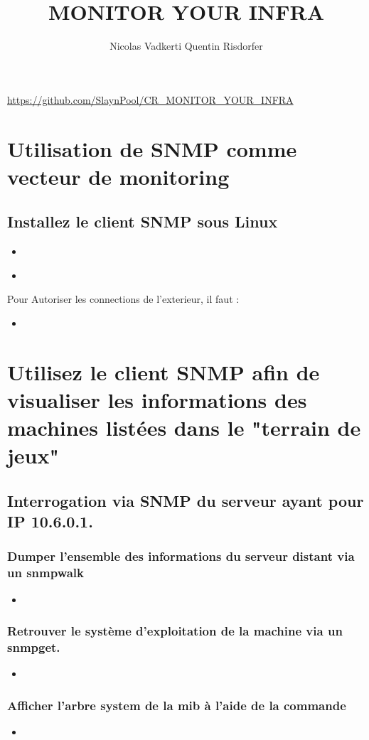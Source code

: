 \documentclass[10pt,a4paper]{article}
\title{MONITOR YOUR INFRA}
\author{Nicolas Vadkerti Quentin Risdorfer}
\newcommand{\insertcode}[2]{\begin{itemize}\item[]\end{itemize}}
\begin{document}
\maketitle


\url{https://github.com/SlaynPool/CR_MONITOR_YOUR_INFRA}



\section{Utilisation de SNMP comme vecteur de monitoring}
\subsection{Installez le client SNMP sous Linux}

\insertcode{commande/1.txt}{Installation d'un Client}

\insertcode{commande/2.txt}{Test d'interrogation}

Pour Autoriser les connections de l'exterieur, il faut :

\insertcode{commande/3.txt}{snmpd.conf}

\section{Utilisez le client SNMP afin de visualiser les informations des machines listées dans le "terrain de jeux"}
\subsection{Interrogation via SNMP du serveur ayant pour IP 10.6.0.1.}

\subsubsection{Dumper l’ensemble des informations du serveur distant via un snmpwalk}
\insertcode{commande/4.txt}{snmpwalk}

\subsubsection{Retrouver le système d’exploitation de la machine via un snmpget.}
\insertcode{commande/5.txt}{snmpget}

\subsubsection{Afficher l’arbre system de la mib à l’aide de la commande }
\insertcode{commande/6.txt}{Arbre de la mib SNMPv2}
\end{document}
